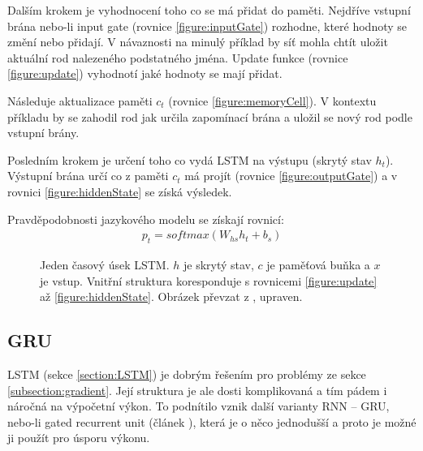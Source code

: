 Dalším krokem je vyhodnocení toho co se má přidat do paměti. Nejdříve vstupní brána nebo-li input gate (rovnice \ref{figure:inputGate}) rozhodne, které hodnoty se změní nebo přidají. V návaznosti na minulý příklad by síť mohla chtít uložit aktuální rod nalezeného podstatného jména. Update funkce (rovnice \ref{figure:update}) vyhodnotí jaké hodnoty se mají přidat.

Následuje aktualizace paměti $c_t$ (rovnice \ref{figure:memoryCell}). V kontextu příkladu by se zahodil rod jak určila zapomínací brána a uložil se nový rod podle vstupní brány.

Posledním krokem je určení toho co vydá LSTM na výstupu (skrytý stav $h_t$). Výstupní brána určí co z paměti $c_t$ má projít (rovnice \ref{figure:outputGate}) a v rovnici \ref{figure:hiddenState} se získá výsledek.

Pravděpodobnosti jazykového modelu se získají rovnicí:
\begin{align}
    p_t = softmax(W_{hs}h_{t} + b_{s})
\end{align}


\begin{figure}[h]
    \begin{center}
    \end{center}
	\caption{Jeden časový úsek LSTM. $h$ je skrytý stav, $c$ je paměťová buňka a $x$ je vstup. Vnitřní struktura koresponduje s rovnicemi \ref{figure:update} až \ref{figure:hiddenState}. Obrázek převzat z \cite{understandingLSTM}, upraven.}
	\label{img:LSTM}
\end{figure}



\subsection{GRU}\label{section:GRU}
LSTM (sekce \ref{section:LSTM}) je dobrým řešením pro problémy ze sekce \ref{subsection:gradient}. Její struktura je ale dosti komplikovaná a tím pádem i náročná na výpočetní výkon. To podnítilo vznik další varianty RNN -- GRU, nebo-li gated recurrent unit (článek \cite{GRU}), která je o něco jednodušší a proto je možné ji použít pro úsporu výkonu.

